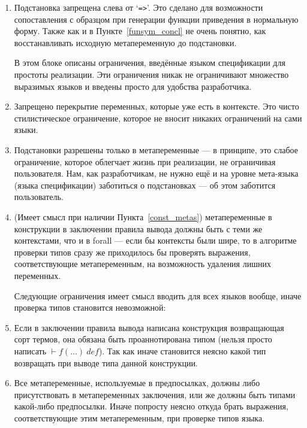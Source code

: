 \begin{enumerate}
\item Подстановка запрещена слева от `\lstinline{=>}'. Это сделано для возможности сопоставления с образцом при генерации функции приведения в нормальную форму. Также как и в Пункте~\ref{funsym_concl} не очень понятно, как восстанавливать исходную метапеременную до подстановки.



\hfill

В этом блоке описаны ограничения, введённые языком спецификации для простоты реализации. Эти ограничения никак не ограничивают множество выразимых языков и введены просто для удобства разработчика.
\item Запрещено перекрытие переменных, которые уже есть в контексте. Это чисто стилистическое ограничение, которое не вносит никаких ограничений на сами языки.

\item Подстановки разрешены только в метапеременные --- в принципе, это слабое ограничение, которое облегчает жизнь при реализации, не ограничивая пользователя. Нам, как разработчикам, не нужно ещё и на уровне мета-языка (языка спецификации) заботиться о подстановках --- об этом заботится пользователь.

\item (Имеет смысл при наличии Пункта~\ref{const_metas}) метапеременные в конструкции в заключении правила вывода должны быть с теми же контекстами, что и в forall --- если бы контексты были шире, то в алгоритме проверки типов сразу же приходилось бы проверять выражения, соответствующие метапеременным, на возможность удаления лишних переменных.

\hfill

Следующие ограничения имеет смысл вводить для всех языков вообще, иначе проверка типов становится невозможной:

\item Если в заключении правила вывода написана конструкция возвращающая сорт термов, она обязана быть проаннотирована типом (нельзя просто написать $ \vdash f(\ldots)\ def$). Так как иначе становится неясно какой тип возвращать при выводе типа данной конструкции.

\item \label{tm:Meta} Все метапеременные, используемые в предпосылках, должны либо присутствовать в метапеременных заключения, или же должны быть типами какой-либо предпосылки. Иначе попросту неясно откуда брать выражения, соответствующие этим метапеременным, при проверке типов языка.


\end{enumerate}
